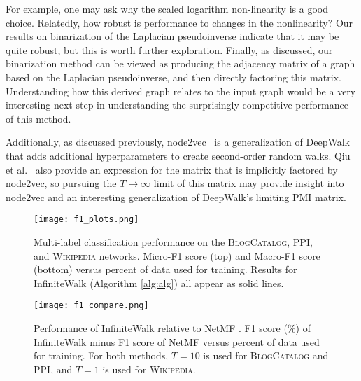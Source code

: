 \documentclass[sigconf]{acmart}
\begin{document}
For example, one may ask why the scaled logarithm non-linearity is a good choice. Relatedly, how robust is performance to changes in the nonlinearity? Our results on binarization of the Laplacian pseudoinverse indicate that it may be quite robust, but this is worth further exploration. Finally, as discussed, our binarization method can be viewed as producing the adjacency matrix of a graph based on the Laplacian pseudoinverse, and then directly factoring this matrix. Understanding how this derived graph relates to the input graph would be a very interesting next step in understanding the surprisingly competitive performance of this method.

Additionally, as discussed previously, node2vec~\cite{grover2016node2vec} is a  generalization of DeepWalk that adds additional hyperparameters to create second-order random walks. Qiu et al.~\cite{qiu2018network} also provide an expression for the matrix that is implicitly factored by node2vec, so pursuing the $T\rightarrow\infty$ limit of this matrix may provide insight into node2vec and an interesting generalization of DeepWalk's limiting PMI matrix. 


\begin{figure*}[p]
\begin{center}
\texttt{[image: f1\_plots.png]}
\end{center}
\caption{Multi-label classification performance on the \textsc{BlogCatalog}, \textsc{PPI}, and \textsc{Wikipedia} networks. Micro-F1 score (top) and Macro-F1 score (bottom) versus percent of data used for training. Results for InfiniteWalk (Algorithm \ref{alg:alg}) all appear as solid lines.}
\label{all_f1_scores}
\end{figure*}

\begin{figure*}[p]
\begin{center}
\texttt{[image: f1\_compare.png]}
\end{center}
\caption{Performance of InfiniteWalk relative to NetMF \cite{qiu2018network}. F1 score (\%) of InfiniteWalk minus F1 score of NetMF versus percent of data used for training. For both methods, $T=10$ is used for \textsc{BlogCatalog} and \textsc{PPI}, and $T=1$ is used for \textsc{Wikipedia}.}
\label{f1_compare}
\end{figure*}
\end{document}
